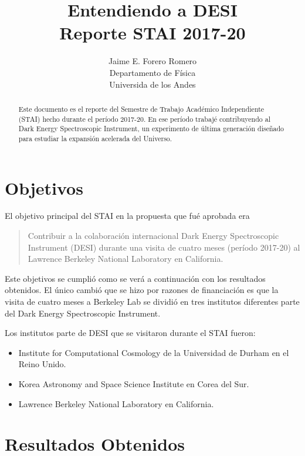 \documentclass[12pt,spanish]{article}
\title{{\sc Entendiendo a DESI}\\{\small\sc Reporte STAI 2017-20}}
\author{Jaime E. Forero Romero\\Departamento de F\'isica\\Universida
  de los Andes}
\begin{document}
\maketitle
\begin{abstract}
Este documento es el reporte del Semestre de Trabajo Acad\'emico
Independiente (STAI) hecho durante el per\'iodo 2017-20. 
En ese per\'iodo trabaj\'e contribuyendo al Dark Energy Spectroscopic
Instrument, un experimento de \'ultima generaci\'on dise\~nado para
estudiar la expansi\'on acelerada del Universo.
\end{abstract}

\section{Objetivos}

El objetivo principal del STAI en la propuesta que fu\'e aprobada era 
\begin{quote}
Contribuir a la colaboraci\'on internacional Dark Energy Spectroscopic
Instrument (DESI) durante una visita de cuatro meses (per\'iodo
2017-20) al Lawrence Berkeley National Laboratory en California.  
\end{quote}

Este objetivos se cumpli\'o como se ver\'a a continuaci\'on con los
resultados obtenidos.
El \'unico cambi\'o que se hizo por razones de financiaci\'on es que
la visita de cuatro meses a Berkeley Lab se dividi\'o en tres
institutos diferentes parte del Dark Energy Spectroscopic Instrument. 


Los institutos parte de DESI que se visitaron durante el STAI fueron:
\begin{itemize}
\item{Institute for Computational Cosmology de la Universidad de
  Durham en el Reino Unido.}
\item{Korea Astronomy and Space Science Institute en Corea del Sur.}
\item{Lawrence Berkeley National Laboratory en California.}
\end{itemize}


\section*{Resultados Obtenidos}
\end{document}

